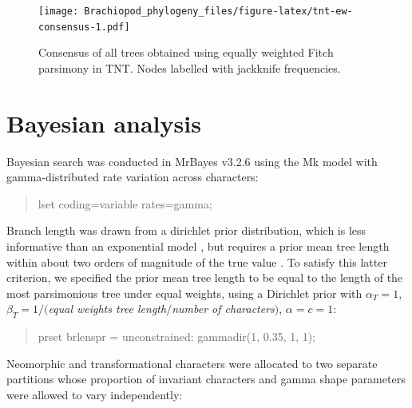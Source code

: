 \documentclass[openany]{book}
\begin{document}
\newpage




\begin{figure}
\centering
\texttt{[image: Brachiopod\_phylogeny\_files/figure-latex/tnt-ew-consensus-1.pdf]}
\caption{\label{fig:tnt-ew-consensus}Consensus of all trees obtained using equally weighted
Fitch parsimony in TNT. Nodes labelled with jackknife frequencies.}
\end{figure}

\hypertarget{bayesian}{\chapter{Bayesian analysis}\label{bayesian}}

Bayesian search was conducted in MrBayes v3.2.6 \citep{Ronquist2012}
using the Mk model \citep{Lewis2001} with gamma-distributed rate
variation across characters:

\begin{quote}
lset coding=variable rates=gamma;
\end{quote}

Branch length was drawn from a dirichlet prior distribution, which is
less informative than an exponential model \citep{Rannala2012}, but
requires a prior mean tree length within about two orders of magnitude
of the true value \citep{Zhang2012}. To satisfy this latter criterion,
we specified the prior mean tree length to be equal to the length of the
most parsimonious tree under equal weights, using a Dirichlet prior with
\(\alpha_T = 1\), \(\beta_T = 1/(\)\emph{equal weights tree
length}\(/\)\emph{number of characters}\()\), \(\alpha = c = 1\):

\begin{quote}
prset brlenspr = unconstrained: gammadir(1, 0.35, 1, 1);
\end{quote}

Neomorphic and transformational characters
\citep[\emph{sensu}][]{Sereno2007} were allocated to two separate
partitions whose proportion of invariant characters and gamma shape
parameters were allowed to vary independently:
\end{document}
